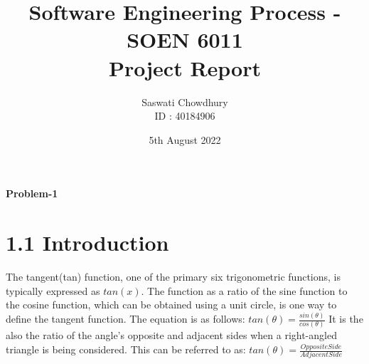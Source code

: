 \documentclass[12pt]{article}
\title{ \centering Software Engineering Process - SOEN 6011 \\ Project Report}
\author{Saswati Chowdhury \\ ID : 40184906}
\date{5th August 2022}
\begin{document}
\maketitle
\noindent
\newpage
\noindent
\Large\textbf{Problem-1}
\section*{1.1 Introduction}


The tangent(tan) function, one of the primary six trigonometric functions, is typically expressed as $tan(x)$\textbf{\cite{cuemath_link}}.
\newline
The function as a ratio of the sine function to the cosine function, which can be obtained using a unit circle, is one way to define the tangent function\textbf{\cite{cuemath_link}}. The equation is as follows:
\newline
\newline
$tan(\theta) = \frac{ sin(\theta)}{cos(\theta) }$
\newline
\newline
It is the also the ratio of the angle's opposite and adjacent sides when a right-angled triangle is being considered\textbf{\cite{mathlearning_link}}. This can be referred to as:  
\newline
\newline
$tan( \theta ) = \frac{Opposite Side}{Adjacent Side}$
\newline
\end{document}
